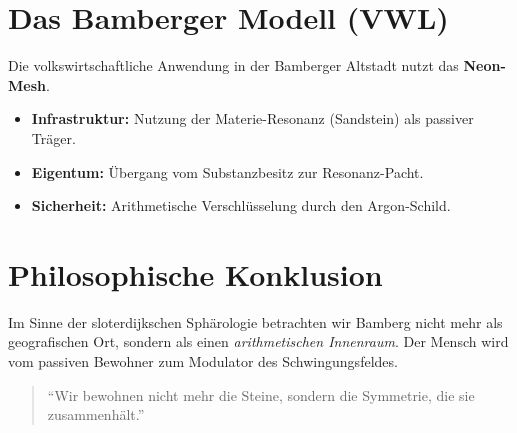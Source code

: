 \documentclass[12pt,a4paper]{article}
\begin{document}
	\section{Das Bamberger Modell (VWL)}
	Die volkswirtschaftliche Anwendung in der Bamberger Altstadt nutzt das \textbf{Neon-Mesh}. 
	
	\begin{itemize}
		\item \textbf{Infrastruktur:} Nutzung der Materie-Resonanz (Sandstein) als passiver Träger.
		\item \textbf{Eigentum:} Übergang vom Substanzbesitz zur Resonanz-Pacht.
		\item \textbf{Sicherheit:} Arithmetische Verschlüsselung durch den Argon-Schild.
	\end{itemize}
	
	\section{Philosophische Konklusion}
	Im Sinne der sloterdijkschen Sphärologie betrachten wir Bamberg nicht mehr als geografischen Ort, sondern als einen \textit{arithmetischen Innenraum}. Der Mensch wird vom passiven Bewohner zum Modulator des Schwingungsfeldes.
	
	\begin{quote}
		``Wir bewohnen nicht mehr die Steine, sondern die Symmetrie, die sie zusammenhält.''
	\end{quote}
	
\end{document}
